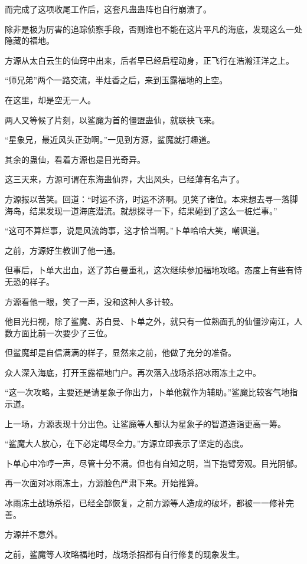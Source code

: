 \begin{this_body}
而完成了这项收尾工作后，这套凡蛊蛊阵也自行崩溃了。

除非是极为厉害的追踪侦察手段，否则谁也不能在这片平凡的海底，发现这么一处隐藏的福地。

方源从太白云生的仙窍中出来，后者早已经启程动身，正飞行在浩瀚汪洋之上。

“师兄弟”两个一路交流，半炷香之后，来到玉露福地的上空。

在这里，却是空无一人。

两人又等候了片刻，以鲨魔为首的僵盟蛊仙，就联袂飞来。

“星象兄，最近风头正劲啊。”一见到方源，鲨魔就打趣道。

其余的蛊仙，看着方源也是目光奇异。

这三天来，方源可谓在东海蛊仙界，大出风头，已经薄有名声了。

方源报以苦笑。回道：“时运不济，时运不济啊。见笑了诸位。本来想去寻一落脚海岛，结果发现一道海底潜流。就想探寻一下，结果碰到了这么一桩烂事。”

“这可不算烂事，说是风流韵事，这才恰当啊。”卜单哈哈大笑，嘲讽道。

之前，方源好生教训了他一通。

但事后，卜单大出血，送了苏白曼重礼，这次继续参加福地攻略。态度上有些有恃无恐的样子。

方源看他一眼，笑了一声，没和这种人多计较。

他目光扫视，除了鲨魔、苏白曼、卜单之外，就只有一位熟面孔的仙僵沙南江，人数方面比前一次要少了三位。

但鲨魔却是自信满满的样子，显然来之前，他做了充分的准备。

众人深入海底，打开玉露福地门户。再次落入战场杀招冰雨冻土之中。

“这一次攻略，主要还是请星象子你出力，卜单他就作为辅助。”鲨魔比较客气地指示道。

上一场，方源表现十分出色。让鲨魔等人都认为星象子的智道造诣更高一筹。

“鲨魔大人放心，在下必定竭尽全力。”方源立即表示了坚定的态度。

卜单心中冷哼一声，尽管十分不满。但也有自知之明，当下抱臂旁观。目光阴郁。

再一次面对冰雨冻土，方源脸色严肃下来。开始推算。

冰雨冻土战场杀招，已经全部恢复，之前方源等人造成的破坏，都被一一修补完善。

方源并不意外。

之前，鲨魔等人攻略福地时，战场杀招都有自行修复的现象发生。


\end{this_body}
